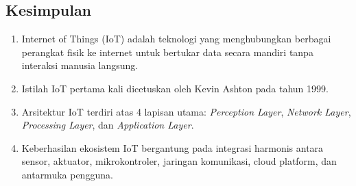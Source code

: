 \subsection{Kesimpulan}
\begin{enumerate}
    \item Internet of Things (IoT) adalah teknologi yang menghubungkan berbagai perangkat fisik ke internet untuk bertukar data secara mandiri tanpa interaksi manusia langsung.
    \item Istilah IoT pertama kali dicetuskan oleh Kevin Ashton pada tahun 1999.
    \item Arsitektur IoT terdiri atas 4 lapisan utama: \textit{Perception Layer}, \textit{Network Layer}, \textit{Processing Layer}, dan \textit{Application Layer}.
    \item Keberhasilan ekosistem IoT bergantung pada integrasi harmonis antara sensor, aktuator, mikrokontroler, jaringan komunikasi, cloud platform, dan antarmuka pengguna.
\end{enumerate}
